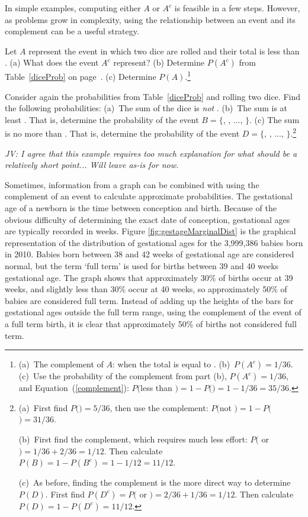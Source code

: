 In simple examples, computing either $A$ or $A^c$ is feasible in a few steps. However, as problems grow in complexity, using the relationship between an event and its complement can be a useful strategy.

\begin{exercise}
Let $A$ represent the event in which two dice are rolled and their total is less than . (a) What does the event $A^c$ represent? (b) Determine $P(A^c)$ from Table~\ref{diceProb} on page~\pageref{diceProb}. (c) Determine $P(A)$.\footnote{(a)~The complement of $A$: when the total is equal to . (b)~$P(A^c) = 1/36$. (c)~Use the probability of the complement from part (b), $P(A^c) = 1/36$, and Equation~(\ref{complement}): $P($less than $) = 1 - P($$) = 1 - 1/36 = 35/36$.}
\end{exercise}

\begin{exercise} Consider again the probabilities from Table~\ref{diceProb} and rolling two dice. Find the following probabilities: (a)~The sum of the dice is \emph{not} . (b)~The sum is at least . That is, determine the probability of the event $B=\{$, , ..., $\}$. (c) The sum is no more than . That is, determine the probability of the event $D=\{$, , ..., $\}$.\footnote{(a)~First find $P($$)=5/36$, then use the complement: $P($not $) = 1 - P($$) = 31/36$.

(b)~First find  the complement, which requires much less effort: $P($ or $)=1/36+2/36=1/12$. Then calculate $P(B) = 1-P(B^c) = 1-1/12 = 11/12$.

(c)~As before, finding the complement is the more direct way to determine $P(D)$. First find $P(D^c) = P($ or $)=2/36 + 1/36=1/12$. Then calculate $P(D) = 1 - P(D^c) = 11/12$.}
\end{exercise}

\textit{JV: I agree that this example requires too much explanation for what should be a relatively short point... Will leave as-is for now.}

Sometimes, information from a graph can be combined with using the complement of an event to calculate approximate probabilities. The gestational age of a newborn is the time between conception and birth. Because of the obvious difficulty of determining the exact date of conception, gestational ages are typically recorded in weeks. Figure \ref{fig:gestageMarginalDist} is the graphical representation of the distribution of gestational ages for the  3,999,386 babies born in 2010.  Babies born between 38 and 42 weeks of gestational age are considered normal, but the term `full term' is used for births between 39 and 40 weeks gestational age.  The graph shows that approximately 30\% of births occur at 39 weeks, and slightly less than 30\% occur at 40 weeks, so approximately 50\% of babies are considered full term.  Instead of adding up the heights of the bars for gestational ages outside the full term range, using the complement of the event of a full term birth, it is clear that approximately 50\% of births not considered full term.

